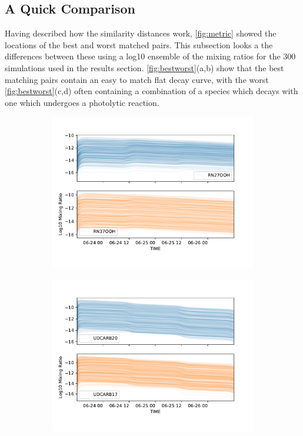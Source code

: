   \subsection{A Quick Comparison}
  Having described how the similarity distances work, \autoref{fig:metric} showed the locations of the best and worst matched pairs. This subsection looks a the differences between these using a log10 ensemble of the mixing ratios for the 300 simulations used in the results section. \autoref{fig:bestworst}(a,b) show that the best matching pairs contain an easy to match flat decay curve, with the worst \autoref{fig:bestworst}(c,d) often containing a combination of a species which decays with one which undergoes a photolytic reaction.


  \begin{figure}[H]
  \begin{subfigure}[t]{.5\textwidth}
    \centering
    \includegraphics[width=\textwidth]{ensemble/RN27OOH-RN37OOH.pdf}
    \caption{}
  \end{subfigure}%
  \begin{subfigure}[t]{.5\textwidth}
    \centering
    \includegraphics[width=\textwidth]{ensemble/UDCARB20-UDCARB17.pdf}
    \caption{}
  \end{subfigure}%


\end{figure}
